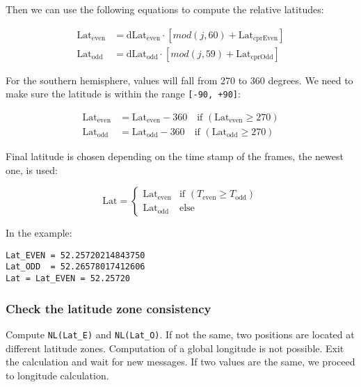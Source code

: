 Then we can use the following equations to compute the relative latitudes:

\begin{equation}
  \begin{split}
    \mathrm{Lat}_\mathrm{even} &= \mathrm{dLat}_\mathrm{even} \cdot [mod(j, 60) + \mathrm{Lat}_\mathrm{cprEven}] \\
    \mathrm{Lat}_\mathrm{odd} &= \mathrm{dLat}_\mathrm{odd} \cdot [mod(j, 59) + \mathrm{Lat}_\mathrm{cprOdd}]
  \end{split}
\end{equation}

For the southern hemisphere, values will fall from 270 to 360 degrees. We need to make sure the latitude is within the range
\texttt{{[}-90,\ +90{]}}:

\begin{equation}
  \begin{split}
    \mathrm{Lat}_\mathrm{even} &= \mathrm{Lat}_\mathrm{even} - 360  \quad \text{if } (\mathrm{Lat}_\mathrm{even} \geq 270) \\
    \mathrm{Lat}_\mathrm{odd} &= \mathrm{Lat}_\mathrm{odd} - 360  \quad \text{if } (\mathrm{Lat}_\mathrm{odd} \geq 270)
  \end{split}
\end{equation}

Final latitude is chosen depending on the time stamp of the frames, the newest one, is used:

\begin{equation}
  \mathrm{Lat} =
  \begin{cases}
   \mathrm{Lat}_\mathrm{even}     & \text{if } (T_\mathrm{even} \geq T_\mathrm{odd}) \\
   \mathrm{Lat}_\mathrm{odd}     & \text{else}
  \end{cases}
\end{equation}

In the example:

\begin{verbatim}
Lat_EVEN = 52.25720214843750
Lat_ODD  = 52.26578017412606
Lat = Lat_EVEN = 52.25720
\end{verbatim}

\subsubsection{Check the latitude zone
consistency}\label{check-the-latitude-zone-consistency}

Compute \texttt{NL(Lat\_E)} and \texttt{NL(Lat\_O)}. If not the same, two positions are located at different latitude zones. Computation of a global longitude is not possible. Exit the calculation and wait for new messages. If two values are the same, we proceed to longitude calculation.

